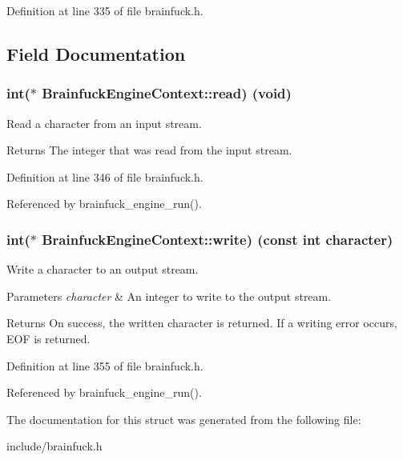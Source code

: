 Definition at line 335 of file brainfuck.\+h.



\subsection{Field Documentation}
\hypertarget{structBrainfuckEngineContext_a6b4909f710378c98e9b984afc78b9099}{}
\subsubsection[{read}]{\setlength{\rightskip}{0pt plus 5cm}int($\ast$ Brainfuck\+Engine\+Context\+::read) (void)}\label{structBrainfuckEngineContext_a6b4909f710378c98e9b984afc78b9099}


Read a character from an input stream. 

\begin{DoxyReturn}{Returns}
The integer that was read from the input stream. 
\end{DoxyReturn}


Definition at line 346 of file brainfuck.\+h.



Referenced by brainfuck\+\_\+engine\+\_\+run().

\hypertarget{structBrainfuckEngineContext_a8495230add7edb7d8f87bd1ef9771239}{}
\subsubsection[{write}]{\setlength{\rightskip}{0pt plus 5cm}int($\ast$ Brainfuck\+Engine\+Context\+::write) (const int character)}\label{structBrainfuckEngineContext_a8495230add7edb7d8f87bd1ef9771239}


Write a character to an output stream. 


\begin{DoxyParams}{Parameters}
{\em character} & An integer to write to the output stream. \\
\hline
\end{DoxyParams}
\begin{DoxyReturn}{Returns}
On success, the written character is returned. If a writing error occurs, E\+O\+F is returned. 
\end{DoxyReturn}


Definition at line 355 of file brainfuck.\+h.



Referenced by brainfuck\+\_\+engine\+\_\+run().



The documentation for this struct was generated from the following file\+:\begin{DoxyCompactItemize}
\item 
include/brainfuck.\+h\end{DoxyCompactItemize}
